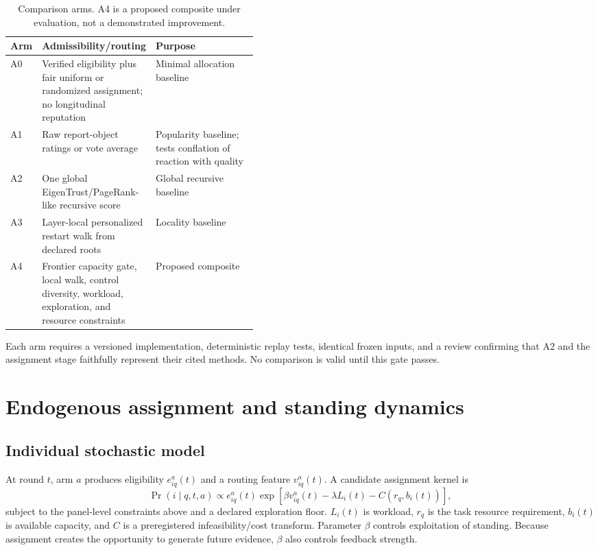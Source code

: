 \documentclass[11pt]{article}
\begin{document}
\begin{table}[htbp]
\centering
\caption{Comparison arms.  A4 is a proposed composite under evaluation, not a demonstrated improvement.}
\label{tab:arms}
\begin{tabularx}{\linewidth}{@{}p{0.08\linewidth}p{0.34\linewidth}X@{}}
\toprule
Arm & Admissibility/routing & Purpose \\
\midrule
A0 & Verified eligibility plus fair uniform or randomized assignment; no longitudinal reputation & Minimal allocation baseline \\
A1 & Raw report-object ratings or vote average & Popularity baseline; tests conflation of reaction with quality \\
A2 & One global EigenTrust/PageRank-like recursive score & Global recursive baseline \\
A3 & Layer-local personalized restart walk from declared roots & Locality baseline \\
A4 & Frontier capacity gate, local walk, control diversity, workload, exploration, and resource constraints & Proposed composite \\
\bottomrule
\end{tabularx}
\end{table}


\begin{evidencegate}
Each arm requires a versioned implementation, deterministic replay tests, identical frozen inputs, and a review confirming that A2 and the assignment stage faithfully represent their cited methods.  No comparison is valid until this gate passes.
\end{evidencegate}

\section{Endogenous assignment and standing dynamics}

\subsection{Individual stochastic model}

At round $t$, arm $a$ produces eligibility $e^a_{iq}(t)$ and a routing feature $v^a_{iq}(t)$.  A candidate assignment kernel is
\begin{equation}
 \Pr(i\mid q,t,a)\propto e^a_{iq}(t)
 \exp\!\left[\beta v^a_{iq}(t)-\lambda L_i(t)-C(r_q,b_i(t))\right],
 \label{eq:assignment}
\end{equation}
subject to the panel-level constraints above and a declared exploration floor.  $L_i(t)$ is workload, $r_q$ is the task resource requirement, $b_i(t)$ is available capacity, and $C$ is a preregistered infeasibility/cost transform.  Parameter $\beta$ controls exploitation of standing.  Because assignment creates the opportunity to generate future evidence, $\beta$ also controls feedback strength.
\end{document}
